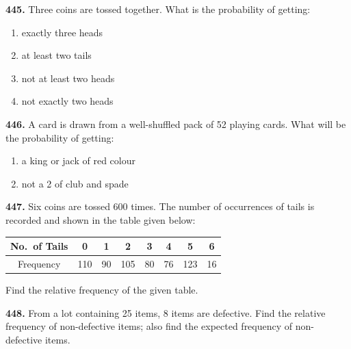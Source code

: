 \documentclass[11pt]{article}
\begin{document}
\bigskip
\noindent\textbf{445.} Three coins are tossed together. What is the probability of getting:
\begin{enumerate}[label=(\roman*)]
\item exactly three heads
\item at least two tails
\item not at least two heads
\item not exactly two heads
\end{enumerate}

\bigskip
\noindent\textbf{446.} A card is drawn from a well-shuffled pack of 52 playing cards. What will be the probability of getting:
\begin{enumerate}[label=(\roman*)]
\item a king or jack of red colour
\item not a 2 of club and spade
\end{enumerate}

\bigskip
\noindent\textbf{447.} Six coins are tossed 600 times. The number of occurrences of tails is recorded and shown in the table given below:

\begin{center}
\begin{tabular}{|c|c|c|c|c|c|c|c|}
\hline
No.\ of Tails & 0 & 1 & 2 & 3 & 4 & 5 & 6 \\
\hline
Frequency & 110 & 90 & 105 & 80 & 76 & 123 & 16 \\
\hline
\end{tabular}
\end{center}

Find the relative frequency of the given table.

\bigskip
\noindent\textbf{448.} From a lot containing 25 items, 8 items are defective. Find the relative frequency of non-defective items; also find the expected frequency of non-defective items.
\end{document}
